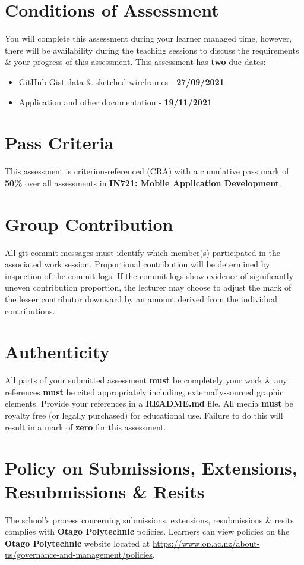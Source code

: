 \documentclass{article}
\begin{document}
\section*{Conditions of Assessment}
You will complete this assessment during your learner managed time, however, there will be availability during the teaching sessions to discuss the requirements \& your progress of this assessment. This assessment has \textbf{two} due dates:
\begin{itemize}
	\item GitHub Gist data \& sketched wireframes - \textbf{27/09/2021}
	\item Application and other documentation - \textbf{19/11/2021}
\end{itemize}

\section*{Pass Criteria}
This assessment is criterion-referenced (CRA) with a cumulative pass mark of \textbf{50\%} over all assessments in \textbf{IN721: Mobile Application Development}.

\section*{Group Contribution}
All git commit messages must identify which member(s) participated in the associated work session. Proportional contribution will be determined by inspection of the commit logs. If the commit logs show evidence of significantly uneven contribution proportion, the lecturer may choose to adjust the mark of the lesser contributor downward by an amount derived from the individual contributions.

\section*{Authenticity}
All parts of your submitted assessment \textbf{must} be completely your work \& any references \textbf{must} be cited appropriately including, externally-sourced graphic elements. Provide your references in a \textbf{README.md} file. All media \textbf{must} be royalty free (or legally purchased) for educational use. Failure to do this will result in a mark of \textbf{zero} for this assessment.

\section*{Policy on Submissions, Extensions, Resubmissions \& Resits}
The school's process concerning submissions, extensions, resubmissions \& resits complies with \textbf{Otago Polytechnic} policies. Learners can view policies on the \textbf{Otago Polytechnic} website located at \href{https://www.op.ac.nz/about-us/governance-and-management/policies}{https://www.op.ac.nz/about-us/governance-and-management/policies}.
\end{document}
